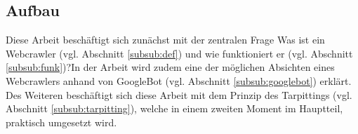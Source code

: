 \subsection{Aufbau}
Diese Arbeit beschäftigt sich zunächst mit der zentralen Frage \glqq Was ist ein Webcrawler (vgl. Abschnitt \ref{subsub:def}) und wie funktioniert er (vgl. Abschnitt \ref{subsub:funk})?\grqq\space In der Arbeit wird zudem eine der möglichen Absichten eines Webcrawlers anhand von GoogleBot (vgl. Abschnitt \ref{subsub:googlebot}) erklärt.\\
Des Weiteren beschäftigt sich diese Arbeit mit dem Prinzip des Tarpittings (vgl. Abschnitt \ref{subsub:tarpitting}), welche in einem zweiten Moment im Hauptteil, praktisch umgesetzt wird.